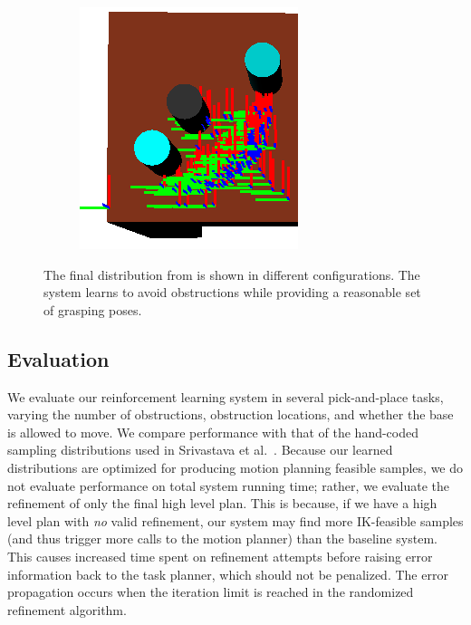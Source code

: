 \begin{figure}
\begin{subfigure}[b]{0.3\linewidth}
    \caption{}
  \end{subfigure}
  \begin{subfigure}[b]{0.3\linewidth}
    \includegraphics[width=\textwidth]{images/finalgraspobstr2.png}
    \caption{}
  \end{subfigure}
  \caption{The final distribution from 
is shown in different configurations. The system learns to
avoid obstructions while providing a reasonable set of grasping poses.}
  \label{fig:obstr}
\end{figure}

\subsection{Evaluation}
We evaluate our reinforcement learning system in several pick-and-place
tasks, varying the number of obstructions, obstruction locations, and whether
the base is allowed to move. We compare performance with that of the
hand-coded sampling distributions used in Srivastava et al.~\cite{srivastava2014combined}.
Because our learned distributions are optimized for producing motion planning
feasible samples, we do not evaluate performance on total system
running time; rather, we evaluate the refinement of only the final high level
plan. This is because, if we have a high level plan with \emph{no} valid refinement,
our system may find more IK-feasible samples (and thus trigger more calls to
the motion planner) than the baseline system. This causes increased time spent
on refinement attempts before raising error information back to the task planner,
which should not be penalized. The error propagation occurs when the iteration
limit is reached in the randomized refinement algorithm.

